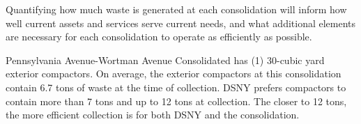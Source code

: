 
    Quantifying how much waste is generated at each consolidation will inform how well current assets and services serve current needs, and what additional elements are necessary for each consolidation to operate as efficiently as possible.
    
    Pennsylvania Avenue-Wortman Avenue Consolidated has (1) 30-cubic yard exterior compactors. On average, the exterior compactors at this consolidation contain 6.7 tons of waste at the time of collection. DSNY prefers compactors to contain more than 7 tons and up to 12 tons at collection. The closer to 12 tons, the more efficient collection is for both DSNY and the consolidation.
